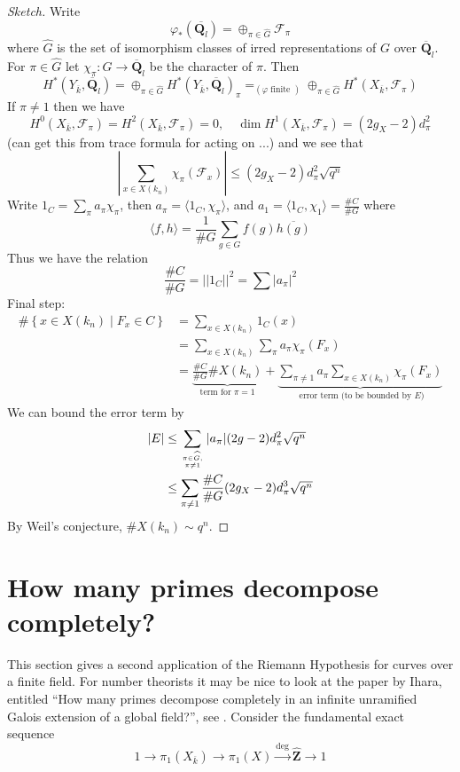 \begin{proof}[Sketch]
Write
$$
\varphi_*(\overline{\mathbf{Q}_l}) =
\oplus_{\pi \in \widehat{G}} \mathcal{F}_{\pi}
$$
where $\widehat{G}$ is the set of isomorphism
classes of irred representations of
$G$ over $\overline{\mathbf{Q}}_l$. For $\pi \in \widehat{G}$
let $\chi_{\pi}: G \to \overline{\mathbf{Q}}_l$
be the character of $\pi$. Then
$$
H^*(Y_{\overline{k}}, \overline{\mathbf{Q}}_l) =
\oplus_{\pi\in \widehat{G}}
H^*(Y_{\overline{k}}, \overline{\mathbf{Q}}_l)_\pi
=_{(\varphi\text{ finite })}
\oplus_{\pi\in \widehat{G}}
H^*(X_{\overline{k}}, \mathcal{F}_\pi)
$$
If $\pi\neq 1$ then we have
$$
H^0(X_{\overline{k}}, \mathcal{F}_\pi) =
H^2(X_{\overline{k}}, \mathcal{F}_\pi) = 0,\quad
\dim H^1(X_{\overline{k}}, \mathcal{F}_\pi) = (2g_X - 2)d_\pi^2
$$
(can get this from trace formula for acting on ...) and we see that
$$
|\sum_{x \in X(k_n)} \chi_\pi(\mathcal{F}_x)| \leq
(2g_X - 2) d_\pi^2\sqrt{q^n}
$$
Write $1_C = \sum_\pi a_\pi \chi_\pi$, then
$a_\pi = \langle 1_C, \chi_\pi\rangle$, and
$a_1 = \langle 1_C, \chi_1\rangle = \frac{\# C}{\# G}$ where
$$
\langle f, h\rangle = \frac{1}{\# G}\sum_{g \in G} f(g)\overline{h(g)}
$$
Thus we have the relation
$$
\frac{\# C}{\# G} = ||1_C||^2 = \sum|a_\pi|^2
$$
Final step:
\begin{align*}
\#\left\{x \in X(k_n) \mid F_x \in C\right\}
& =
\sum_{x \in X(k_n)} 1_C(x) \\
& =
\sum_{x \in X(k_n)} \sum_\pi a_\pi \chi_\pi(F_x) \\
& =
\underbrace{\frac{\# C}{\# G} \# X(k_n)}_{
\text{term for }\pi = 1}
+
\underbrace{\sum_{\pi\neq 1}a_\pi\sum_{x\in X(k_n)}\chi_\pi(F_x)}_{
\text{ error term (to be bounded by }E)}
\end{align*}
We can bound the error term by
\begin{align*}
|E|
& \leq
\sum_{\pi \in \widehat{G}, \atop \pi \neq 1}
|a_\pi| (2g - 2) d_\pi^2 \sqrt{q^n} \\
& \leq
\sum_{\pi \neq 1} \frac{\# C}{\# G} (2g_X - 2) d_\pi^3 \sqrt{q^n}
\end{align*}
By Weil's conjecture, $\# X(k_n)\sim q^n$.
\end{proof}



\section{How many primes decompose completely?}
\label{section-how-many}

\noindent
This section gives a second application of the Riemann Hypothesis for
curves over a finite field. For number theorists it may be nice
to look at the paper by Ihara, entitled
``How many primes decompose completely in an infinite unramified Galois
extension of a global field?'', see \cite{Ihara}.
Consider the fundamental exact sequence
$$
1 \to
\pi_1(X_{\overline{k}}) \to
\pi_1(X) \xrightarrow{\deg}
\widehat{\mathbf{Z}} \to 1
$$

